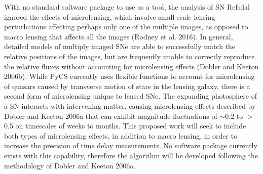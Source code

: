 With no standard software package to use as a tool, the analysis of SN Refsdal ignored the effects of microlensing, which involve small-scale lensing perturbations affecting perhaps only one of the multiple images, as opposed to macro lensing that affects all the images (Rodney et al. 2016). In general, detailed models of multiply imaged SNe are able to successfully match the relative positions of the images, but are frequently unable to correctly reproduce the relative fluxes without accounting for microlensing effects (Dobler and Keeton 2006b). While PyCS currently uses flexible functions to account for microlensing of quasars caused by transverse motion of stars in the lensing galaxy, there is a second form of microlensing unique to lensed SNe. The expanding photosphere of a SN interacts with intervening matter, causing microlensing effects described by Dobler and Keeton 2006a that can exhibit magnitude fluctuations of $\sim$0.2 to $>$0.5 on timescales of weeks to months. This proposed work will seek to include both types of microlensing effects, in addition to macro lensing, in order to increase the precision of time delay measurements. No software package currently exists with this capability, therefore the algorithm will be developed following the methodology of Dobler and Keeton 2006a. 

